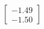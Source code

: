 \documentclass[preview]{standalone}
\begin{document}
\begin{align*}
\begin{bmatrix} -1.49 \\ -1.50 \end{bmatrix}
\end{align*}
\end{document}
